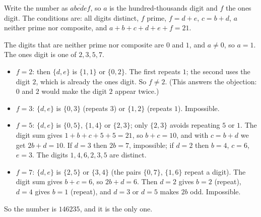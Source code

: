 Write the number as $\overline{abcdef}$, so $a$ is the hundred-thousands digit and $f$ the ones digit. The conditions are: all digits distinct, $f$ prime, $f=d+e$, $c=b+d$, $a$ neither prime nor composite, and $a+b+c+d+e+f=21$.

The digits that are neither prime nor composite are $0$ and $1$, and $a\ne0$, so $a=1$. The ones digit is one of $2,3,5,7$.
\begin{itemize}
\item $f=2$: then $\{d,e\}$ is $\{1,1\}$ or $\{0,2\}$. The first repeats $1$; the second uses the digit $2$, which is already the ones digit. So $f\ne2$. (This answers the objection: $0$ and $2$ would make the digit $2$ appear twice.)
\item $f=3$: $\{d,e\}$ is $\{0,3\}$ (repeats $3$) or $\{1,2\}$ (repeats $1$). Impossible.
\item $f=5$: $\{d,e\}$ is $\{0,5\}$, $\{1,4\}$ or $\{2,3\}$; only $\{2,3\}$ avoids repeating $5$ or $1$. The digit sum gives $1+b+c+5+5=21$, so $b+c=10$, and with $c=b+d$ we get $2b+d=10$. If $d=3$ then $2b=7$, impossible; if $d=2$ then $b=4$, $c=6$, $e=3$. The digits $1,4,6,2,3,5$ are distinct.
\item $f=7$: $\{d,e\}$ is $\{2,5\}$ or $\{3,4\}$ (the pairs $\{0,7\}$, $\{1,6\}$ repeat a digit). The digit sum gives $b+c=6$, so $2b+d=6$. Then $d=2$ gives $b=2$ (repeat), $d=4$ gives $b=1$ (repeat), and $d=3$ or $d=5$ makes $2b$ odd. Impossible.
\end{itemize}
So the number is $\boxed{146235}$, and it is the only one.
